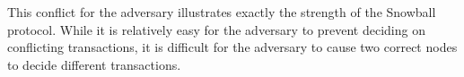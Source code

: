 This conflict for the adversary illustrates exactly the strength of
the Snowball protocol.  While it is relatively easy for the adversary
to prevent deciding on conflicting transactions, it is difficult for
the adversary to cause two correct nodes to decide different transactions.

